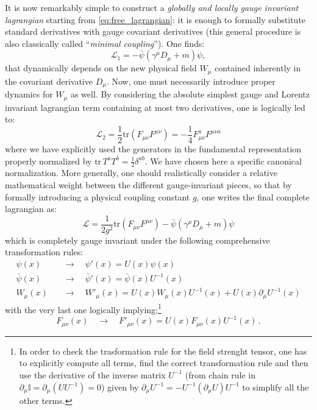 It is now remarkably simple to construct a \textit{globally and locally gauge invariant lagrangian} starting from \eqref{eq:free_lagrangian}: it is enough to formally substitute standard derivatives with gauge covariant derivatives (this general procedure is also classically called ``\textit{minimal coupling}''). One finds:
\[
    \mathcal{L}_1 = -\bar{\psi}(\gamma^\mu D_\mu + m)\psi,
\]
that dynamically depends on the new physical field \(W_\mu\) contained inherently in the covariant derivative \(D_\mu\). Now, one must necessarily introduce proper dynamics for \(W_\mu\) as well. By considering the absolute simplest gauge and Lorentz invariant lagrangian term containing at most two derivatives, one is logically led to:
\[
    \mathcal{L}_2 = \frac{1}{2}\mathrm{tr}(F_{\mu\nu}F^{\mu\nu}) = -\frac{1}{4}F_{\mu\nu}^a F^{\mu\nu a}
\]
where we have explicitly used the generators in the fundamental representation properly normalized by \(\mathrm{tr}\,T^a T^b = \frac{1}{2}\delta^{ab}\). We have chosen here a specific canonical normalization. More generally, one should realistically consider a relative mathematical weight between the different gauge-invariant pieces, so that by formally introducing a physical coupling constant \(g\), one writes the final complete lagrangian as:
\begin{equation} \label{eq:lagrangian_complete}
    \boxed{\mathcal{L} = \frac{1}{2g^2}\mathrm{tr}(F_{\mu\nu}F^{\mu\nu}) - \bar{\psi}(\gamma^\mu D_\mu + m)\psi}
\end{equation}
which is completely gauge invariant under the following comprehensive transformation rules:
\begin{equation} \label{eq:full_transformations}
    \begin{aligned}
        \psi(x) \quad       & \rightarrow \quad \psi'(x) = U(x)\psi(x)                                         \\
        \bar{\psi}(x) \quad & \rightarrow \quad \bar{\psi}'(x) = \bar{\psi}(x)U^{-1}(x)                        \\
        W_\mu(x) \quad      & \rightarrow \quad W'_\mu(x) = U(x)W_\mu(x)U^{-1}(x) + U(x)\partial_\mu U^{-1}(x)
    \end{aligned}
\end{equation}
with the very last one logically implying:\footnote{In order to check the trasformation rule for the field strenght tensor, one has to explicitly compute all terms, find the correct transformation rule and then use the derivative of the inverse matrix \(U^{-1}\) (from chain rule in \(\partial_\mu \mathbb{I} = \partial_\mu (U U^{-1}) = 0\)) given by \(\partial_\mu U^{-1} = -U^{-1}(\partial_\mu U)U^{-1}\) to simplify all the other terms.}
\begin{equation} \label{eq:f_transform_implied}
    F_{\mu\nu}(x) \quad \rightarrow \quad F'_{\mu\nu}(x) = U(x)F_{\mu\nu}(x)U^{-1}(x) \, .
\end{equation}

